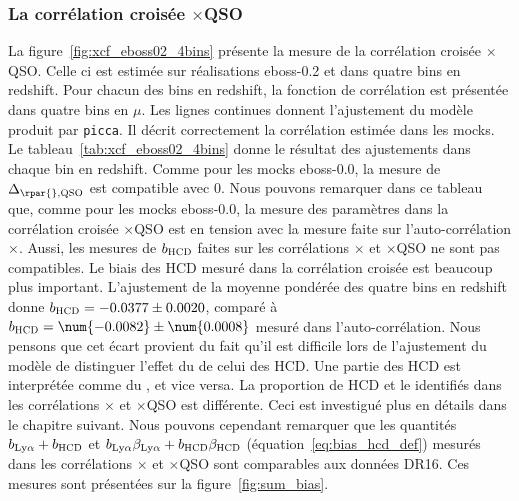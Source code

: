 \subsubsection{La corrélation croisée \lya{}$\times$QSO}
La figure~\ref{fig:xcf_eboss02_4bins} présente la mesure de la corrélation croisée \lya{}$\times$QSO. Celle ci est estimée sur \Nmocks{} réalisations eboss-0.2 et dans quatre bins en redshift. Pour chacun des bins en redshift, la fonction de corrélation est présentée dans quatre bins en $\mu$.
Les lignes continues donnent l'ajustement du modèle produit par \texttt{picca}. Il décrit correctement la corrélation estimée dans les mocks.
Le tableau~\ref{tab:xcf_eboss02_4bins} donne le résultat des ajustements dans chaque bin en redshift.
Comme pour les mocks eboss-0.0, la mesure de $\Delta_{\rpar{}, \textsc{QSO}}$ est compatible avec 0.
Nous pouvons remarquer dans ce tableau que, comme pour les mocks eboss-0.0, la mesure des paramètres \lya{} dans la corrélation croisée \lya{}$\times$QSO est en tension avec la mesure faite sur l'auto-corrélation \lya{}$\times$\lya{}.
  Aussi, les mesures de $b_{\textsc{HCD}}$ faites sur les corrélations \lya{}$\times$\lya{} et \lya{}$\times$QSO ne sont pas compatibles. Le biais des HCD mesuré dans la corrélation croisée est beaucoup plus important. L'ajustement de la moyenne pondérée des quatre bins en redshift donne $b_{\textsc{HCD}} = -0.0377 \pm 0.0020$, comparé à $b_{\textsc{HCD}} = \num{-0.0082} \pm \num{0.0008}$ mesuré dans l'auto-corrélation.
  Nous pensons que cet écart provient du fait qu'il est difficile lors de l'ajustement du modèle de distinguer l'effet du \lya{} de celui des HCD. Une partie des HCD est interprétée comme du \lya{}, et vice versa. La proportion de HCD et le \lya{} identifiés dans les corrélations \lya{}$\times$\lya{} et \lya{}$\times$QSO est différente. Ceci est investigué plus en détails dans le chapitre suivant.
  Nous pouvons cependant remarquer que les quantités $b_{\mathrm{Ly}\alpha} + b_{\textsc{HCD}}$ et $b_{\mathrm{Ly}\alpha}\beta_{\mathrm{Ly}\alpha} + b_{\textsc{HCD}}\beta_{\textsc{HCD}}$ (équation~\ref{eq:bias_hcd_def}) mesurés dans les corrélations \lya{}$\times$\lya{} et \lya{}$\times$QSO sont comparables aux données DR16. Ces mesures sont présentées sur la figure~\ref{fig:sum_bias}.



